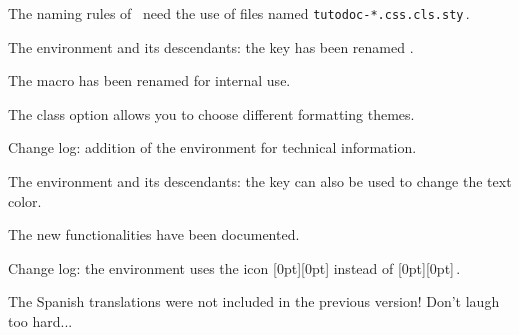 \tdocsep




\begin{tdoctech}[version = 1.6.1, date = 2024-10-28]
    \item The naming rules of \ctan\ need the use of  files named \verb+tutodoc-*.css.cls.sty+\,.
\end{tdoctech}

\tdocsep




\begin{tdocbreak}[version = 1.6.0, date = 2024-10-27]
    \item The  environment and its descendants: the  key has been renamed .

    \item The macro  has been renamed  for internal use.
\end{tdocbreak}


\begin{tdocnew}
    \item The  class option allows you to choose different formatting themes.

    \item Change log: addition of the  environment for technical information.

    \item The  environment and its descendants: the  key can also be used to change the text color.

    \item The new functionalities have been documented.
\end{tdocnew}


\begin{tdocupdate}
    \item Change log: the  environment uses the icon
    \raisebox{0pt}[0pt][0pt]{}
    instead of
    \raisebox{0pt}[0pt][0pt]{\fbox{\faMagic}}\,.
\end{tdocupdate}


\begin{tdocfix}
    \item The Spanish translations were not included in the previous version! Don't laugh too hard...
\end{tdocfix}

